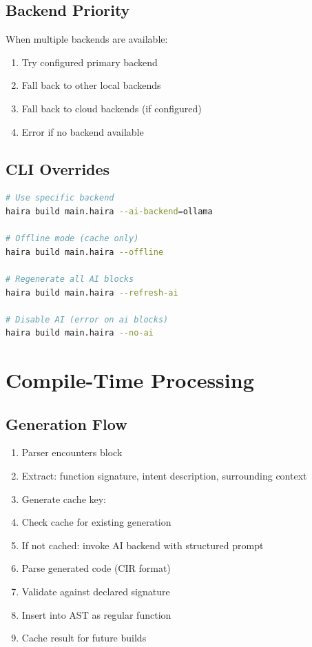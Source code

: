 \subsection{Backend Priority}

When multiple backends are available:

\begin{enumerate}
    \item Try configured primary backend
    \item Fall back to other local backends
    \item Fall back to cloud backends (if configured)
    \item Error if no backend available
\end{enumerate}

\subsection{CLI Overrides}

\begin{lstlisting}[language=bash,numbers=none]
# Use specific backend
haira build main.haira --ai-backend=ollama

# Offline mode (cache only)
haira build main.haira --offline

# Regenerate all AI blocks
haira build main.haira --refresh-ai

# Disable AI (error on ai blocks)
haira build main.haira --no-ai
\end{lstlisting}

\section{Compile-Time Processing}

\subsection{Generation Flow}

\begin{enumerate}
    \item Parser encounters  block
    \item Extract: function signature, intent description, surrounding context
    \item Generate cache key: 
    \item Check cache for existing generation
    \item If not cached: invoke AI backend with structured prompt
    \item Parse generated code (CIR format)
    \item Validate against declared signature
    \item Insert into AST as regular function
    \item Cache result for future builds
\end{enumerate}

